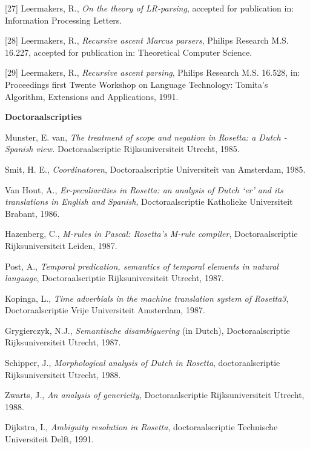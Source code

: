 \bigskip


[27] Leermakers, R., {\em On the theory of LR-parsing}, accepted for 
publication in: {\sf Information Processing Letters}. 

\bigskip

[28] Leermakers, R., {\em Recursive ascent Marcus parsers},
Philips Research M.S. 16.227, accepted for publication in: {\sf 
Theoretical Computer Science}. 

\bigskip

[29] Leermakers, R., {\em Recursive ascent parsing},
Philips Research M.S. 16.528, in: {\sf 
Proceedings first Twente Workshop on Language Technology: Tomita's Algorithm, 
Extensions and Applications, 1991}. 


\newpage

{\bf Doctoraalscripties}

\bigskip

Munster, E. van, {\em The treatment of scope and negation in Rosetta: a Dutch - 
Spanish view.} Doctoraalscriptie Rijksuniversiteit Utrecht, 1985.

\bigskip

Smit, H. E., {\em Coordinatoren},  Doctoraalscriptie Universiteit van 
Amsterdam, 1985.
 
\bigskip

Van Hout, A., {\em Er-peculiarities in Rosetta: an analysis of Dutch `er'
and its translations in English and Spanish}, 
 Doctoraalscriptie Katholieke Universiteit Brabant, 1986.

\bigskip

Hazenberg, C., {\em M-rules in Pascal: Rosetta's M-rule compiler},
 Doctoraalscriptie Rijksuniversiteit Leiden, 1987.

\bigskip

Post, A., {\em Temporal predication, semantics of temporal elements in 
natural language},  Doctoraalscriptie Rijksuniversiteit Utrecht, 1987.

\bigskip

Kopinga, L., {\em Time adverbials in the machine translation system of
Rosetta3},  Doctoraalscriptie Vrije Universiteit Amsterdam, 1987.

\bigskip

Grygierczyk, N.J., {\em Semantische disambiguering} (in Dutch), 
 Doctoraalscriptie Rijksuniversiteit Utrecht, 1987.

\bigskip

Schipper, J., {\em Morphological analysis of Dutch in Rosetta}, doctoraalscriptie
Rijksuniversiteit Utrecht, 1988.

\bigskip

Zwarts, J., {\em An analysis of genericity},
 Doctoraalscriptie Rijksuniversiteit Utrecht, 1988. 

\bigskip

Dijkstra, I., {\em Ambiguity resolution in Rosetta},
doctoraalscriptie Technische Universiteit Delft, 1991.


